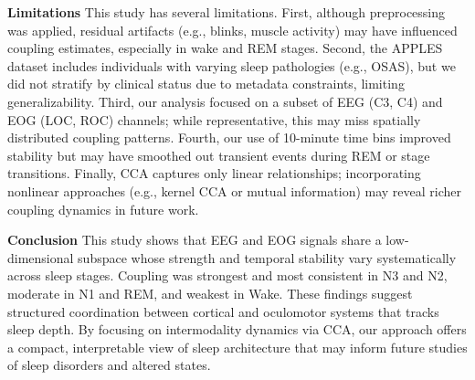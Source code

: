 \textbf{Limitations}
This study has several limitations. First, although preprocessing was applied, residual artifacts (e.g., blinks, muscle activity) may have influenced coupling estimates, especially in wake and REM stages. Second, the APPLES dataset includes individuals with varying sleep pathologies (e.g., OSAS), but we did not stratify by clinical status due to metadata constraints, limiting generalizability. Third, our analysis focused on a subset of EEG (C3, C4) and EOG (LOC, ROC) channels; while representative, this may miss spatially distributed coupling patterns. Fourth, our use of 10-minute time bins improved stability but may have smoothed out transient events during REM or stage transitions. Finally, CCA captures only linear relationships; incorporating nonlinear approaches (e.g., kernel CCA or mutual information) may reveal richer coupling dynamics in future work.

\textbf{Conclusion}
This study shows that EEG and EOG signals share a low-dimensional subspace whose strength and temporal stability vary systematically across sleep stages. Coupling was strongest and most consistent in N3 and N2, moderate in N1 and REM, and weakest in Wake. These findings suggest structured coordination between cortical and oculomotor systems that tracks sleep depth. By focusing on intermodality dynamics via CCA, our approach offers a compact, interpretable view of sleep architecture that may inform future studies of sleep disorders and altered states.

\renewcommand{\baselinestretch}{1.5}
\cleardoublepage    %



